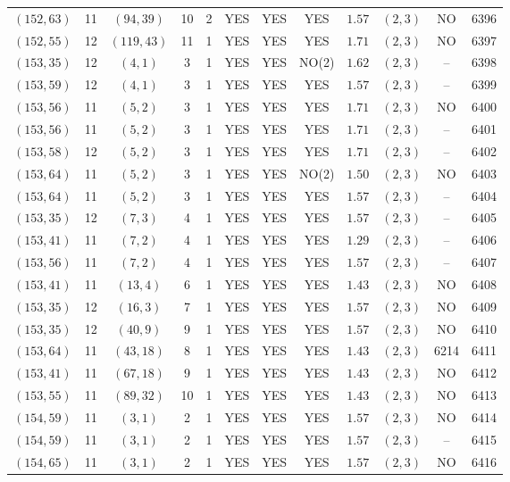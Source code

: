 \begin{longtable}{|c|c|c|c|c|c|c|c|c|c|c|c|}
$(152,63)$ & 11 & $(94,39)$ & 10 & 2 & YES & YES & YES & $1.57$ & $(2,3)$ & NO & 6396\\
$(152,55)$ & 12 & $(119,43)$ & 11 & 1 & YES & YES & YES & $1.71$ & $(2,3)$ & NO & 6397\\
$(153,35)$ & 12 & $(4,1)$ & 3 & 1 & YES & YES & NO(2) & $1.62$ & $(2,3)$ & -- & 6398\\
$(153,59)$ & 12 & $(4,1)$ & 3 & 1 & YES & YES & YES & $1.57$ & $(2,3)$ & -- & 6399\\
$(153,56)$ & 11 & $(5,2)$ & 3 & 1 & YES & YES & YES & $1.71$ & $(2,3)$ & NO & 6400\\
$(153,56)$ & 11 & $(5,2)$ & 3 & 1 & YES & YES & YES & $1.71$ & $(2,3)$ & -- & 6401\\
$(153,58)$ & 12 & $(5,2)$ & 3 & 1 & YES & YES & YES & $1.71$ & $(2,3)$ & -- & 6402\\
$(153,64)$ & 11 & $(5,2)$ & 3 & 1 & YES & YES & NO(2) & $1.50$ & $(2,3)$ & NO & 6403\\
$(153,64)$ & 11 & $(5,2)$ & 3 & 1 & YES & YES & YES & $1.57$ & $(2,3)$ & -- & 6404\\
$(153,35)$ & 12 & $(7,3)$ & 4 & 1 & YES & YES & YES & $1.57$ & $(2,3)$ & -- & 6405\\
$(153,41)$ & 11 & $(7,2)$ & 4 & 1 & YES & YES & YES & $1.29$ & $(2,3)$ & -- & 6406\\
$(153,56)$ & 11 & $(7,2)$ & 4 & 1 & YES & YES & YES & $1.57$ & $(2,3)$ & -- & 6407\\
$(153,41)$ & 11 & $(13,4)$ & 6 & 1 & YES & YES & YES & $1.43$ & $(2,3)$ & NO & 6408\\
$(153,35)$ & 12 & $(16,3)$ & 7 & 1 & YES & YES & YES & $1.57$ & $(2,3)$ & NO & 6409\\
$(153,35)$ & 12 & $(40,9)$ & 9 & 1 & YES & YES & YES & $1.57$ & $(2,3)$ & NO & 6410\\
$(153,64)$ & 11 & $(43,18)$ & 8 & 1 & YES & YES & YES & $1.43$ & $(2,3)$ & 6214 & 6411\\
$(153,41)$ & 11 & $(67,18)$ & 9 & 1 & YES & YES & YES & $1.43$ & $(2,3)$ & NO & 6412\\
$(153,55)$ & 11 & $(89,32)$ & 10 & 1 & YES & YES & YES & $1.43$ & $(2,3)$ & NO & 6413\\
$(154,59)$ & 11 & $(3,1)$ & 2 & 1 & YES & YES & YES & $1.57$ & $(2,3)$ & NO & 6414\\
$(154,59)$ & 11 & $(3,1)$ & 2 & 1 & YES & YES & YES & $1.57$ & $(2,3)$ & -- & 6415\\
$(154,65)$ & 11 & $(3,1)$ & 2 & 1 & YES & YES & YES & $1.57$ & $(2,3)$ & NO & 6416\\

\end{longtable}
